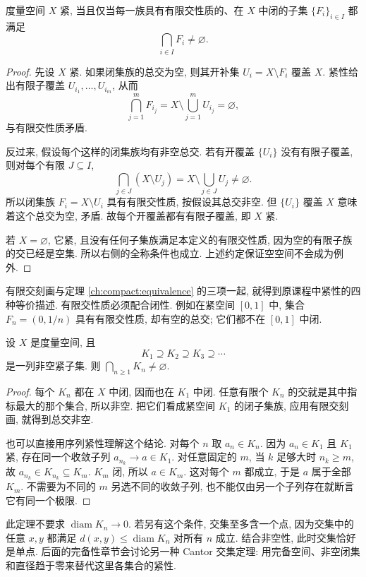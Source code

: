 \begin{theorem}[紧性的有限交刻画]
\label{ch:compact:fip}
度量空间 $X$ 紧, 当且仅当每一族具有有限交性质的、在 $X$ 中闭的子集 $\{F_i\}_{i\in I}$ 都满足
\[
 \bigcap_{i\in I}F_i\ne\varnothing.
\]
\end{theorem}
\begin{proof}
先设 $X$ 紧. 如果闭集族的总交为空, 则其开补集 $U_i=X\setminus F_i$ 覆盖 $X$. 紧性给出有限子覆盖 $U_{i_1},\ldots,U_{i_m}$, 从而
\[
 \bigcap_{j=1}^mF_{i_j}
 =X\setminus\bigcup_{j=1}^mU_{i_j}=\varnothing,
\]
与有限交性质矛盾.

反过来, 假设每个这样的闭集族均有非空总交. 若有开覆盖 $\{U_i\}$ 没有有限子覆盖, 则对每个有限 $J\subseteq I$,
\[
 \bigcap_{j\in J}(X\setminus U_j)
 =X\setminus\bigcup_{j\in J}U_j\ne\varnothing.
\]
所以闭集族 $F_i=X\setminus U_i$ 具有有限交性质, 按假设其总交非空. 但 $\{U_i\}$ 覆盖 $X$ 意味着这个总交为空, 矛盾. 故每个开覆盖都有有限子覆盖, 即 $X$ 紧.

若 $X=\varnothing$, 它紧, 且没有任何子集族满足本定义的有限交性质, 因为空的有限子族的交已经是空集. 所以右侧的全称条件也成立. 上述约定保证空空间不会成为例外.
\end{proof}

有限交刻画与定理 \ref{ch:compact:equivalence} 的三项一起, 就得到原课程中紧性的四种等价描述. 有限交性质必须配合闭性. 例如在紧空间 $[0,1]$ 中, 集合 $F_n=(0,1/n)$ 具有有限交性质, 却有空的总交; 它们都不在 $[0,1]$ 中闭.

\begin{theorem}[嵌套非空紧集的交]
\label{ch:compact:nested}
设 $X$ 是度量空间, 且
\[
 K_1\supseteq K_2\supseteq K_3\supseteq\cdots
\]
是一列非空紧子集. 则 $\bigcap_{n\geq1}K_n\ne\varnothing$.
\end{theorem}
\begin{proof}
每个 $K_n$ 都在 $X$ 中闭, 因而也在 $K_1$ 中闭. 任意有限个 $K_n$ 的交就是其中指标最大的那个集合, 所以非空. 把它们看成紧空间 $K_1$ 的闭子集族, 应用有限交刻画, 就得到总交非空.

也可以直接用序列紧性理解这个结论. 对每个 $n$ 取 $a_n\in K_n$. 因为 $a_n\in K_1$ 且 $K_1$ 紧, 存在同一个收敛子列 $a_{n_k}\to a\in K_1$. 对任意固定的 $m$, 当 $k$ 足够大时 $n_k\geq m$, 故 $a_{n_k}\in K_{n_k}\subseteq K_m$. $K_m$ 闭, 所以 $a\in K_m$. 这对每个 $m$ 都成立, 于是 $a$ 属于全部 $K_m$. 不需要为不同的 $m$ 另选不同的收敛子列, 也不能仅由另一个子列存在就断言它有同一个极限.
\end{proof}

\begin{remark}[直径条件与紧性条件]
此定理不要求 $\operatorname{diam}K_n\to0$. 若另有这个条件, 交集至多含一个点, 因为交集中的任意 $x,y$ 都满足 $d(x,y)\leq\operatorname{diam}K_n$ 对所有 $n$ 成立. 结合非空性, 此时交集恰好是单点. 后面的完备性章节会讨论另一种 Cantor 交集定理: 用完备空间、非空闭集和直径趋于零来替代这里各集合的紧性.
\end{remark}

